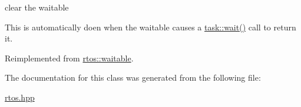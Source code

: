 clear the waitable 

This is automatically doen when the waitable causes a \hyperlink{classrtos_1_1task__base_a32c6e19fe3d25a38587964defdb52ddc}{task\+::wait()} call to return it. 

Reimplemented from \hyperlink{classrtos_1_1waitable_a4571df4fc41d342cce418d591e0a9bdd}{rtos\+::waitable}.



The documentation for this class was generated from the following file\+:\begin{DoxyCompactItemize}
\item 
\hyperlink{rtos_8hpp}{rtos.\+hpp}\end{DoxyCompactItemize}
